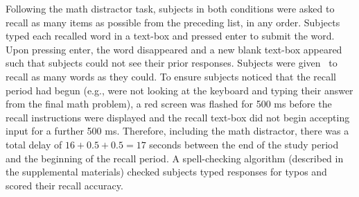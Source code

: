 \documentclass[jou,natbib,floatsintext]{apa6} %
\begin{document}
Following the math distractor task, subjects in both conditions were asked to recall as many items as possible from the preceding list, in any order. Subjects typed each recalled word in a text-box and pressed enter to submit the word. Upon pressing enter, the word disappeared and a new blank text-box appeared such that subjects could not see their prior responses. Subjects were given \recalltime~to recall as many words as they could. To ensure subjects noticed that the recall period had begun (e.g., were not looking at the keyboard and typing their answer from the final math problem), a red screen was flashed for 500 ms before the recall instructions were displayed and the recall text-box did not begin accepting input for a further 500 ms. Therefore, including the math distractor, there was a total delay of $16+0.5+0.5=17$ seconds between the end of the study period and the beginning of the recall period. A spell-checking algorithm (described in the supplemental materials) checked subjects typed responses for typos and scored their recall accuracy.
\end{document}
